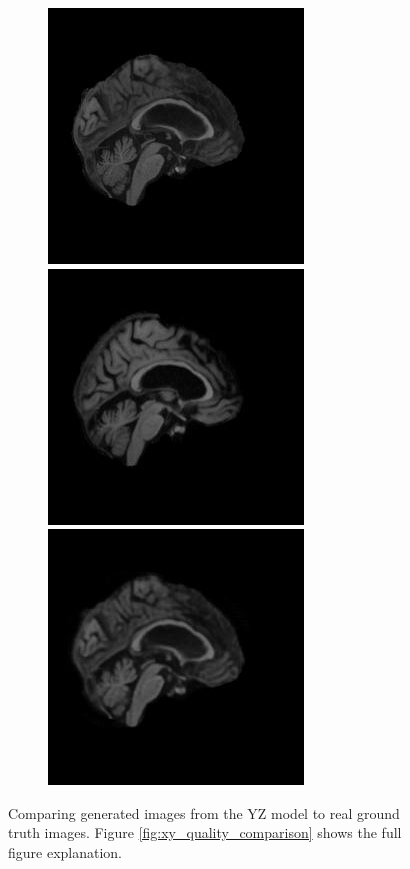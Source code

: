 \documentclass[12pt, fleqn, titlepage]{article}
\newcommand\skipperer{0.45pt}
\newcommand\bigskipx{2.1pt}
\newcommand{\1}[1]{\mathds{1}\left[#1\right]}
\begin{document}
\begin{figure}[H]
\begin{subfigure}[b]{0.7\textwidth}
		\centering
		\includegraphics[width=0.22\linewidth]{imgs/082_S_0469/082_S_0469_yz_3_GT}
		\hskip\skipperer
		\hskip\bigskipx
		\includegraphics[width=0.22\linewidth]{imgs/082_S_0469/082_S_0469_yz_1.5_GT}
		\hskip\skipperer
		\includegraphics[width=0.22\linewidth]{imgs/082_S_0469/ALL_model_082_S_0469_yz_3}
	\end{subfigure}
	\caption{Comparing generated images from the YZ model to real ground truth images. Figure \ref{fig:xy_quality_comparison} shows the full figure explanation.}
	\label{fig:yz_quality_comparison}
\end{figure}
\end{document}
